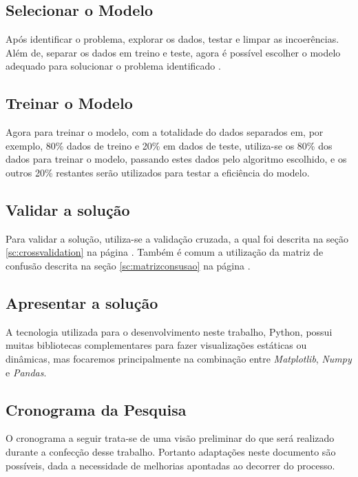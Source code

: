 \subsection{Selecionar o Modelo}
Após identificar o problema, explorar os dados, testar e limpar as incoerências. Além de, separar os dados em treino e teste, agora é possível escolher o modelo adequado para solucionar o problema identificado \cite{geron2017hands}.

\subsection{Treinar o Modelo}
Agora para treinar o modelo, com a totalidade do dados separados em, por exemplo, 80\% dados de treino e 20\% em dados de teste, utiliza-se os 80\% dos dados para treinar o modelo, passando estes dados pelo algoritmo escolhido, e os outros 20\% restantes serão utilizados para testar a eficiência do modelo.

\subsection{Validar a solução}
Para validar a solução, utiliza-se a validação cruzada, a qual foi descrita na seção \ref{sc:crossvalidation} na página \pageref{sc:crossvalidation}. Também é comum a utilização da matriz de confusão descrita na seção \ref{sc:matrizconsusao} na página \pageref{sc:matrizconsusao}.

\subsection{Apresentar a solução}
A tecnologia utilizada para o desenvolvimento neste trabalho, Python, possui muitas bibliotecas complementares para fazer visualizações estáticas ou dinâmicas, mas focaremos principalmente na combinação entre \textit{Matplotlib}, \textit{Numpy} e \textit{Pandas}.

\subsection{Cronograma da Pesquisa}

O cronograma a seguir trata-se de uma visão preliminar do que será realizado durante a confecção desse trabalho. Portanto adaptações neste documento são possíveis, dada a necessidade de melhorias apontadas ao decorrer do processo.

